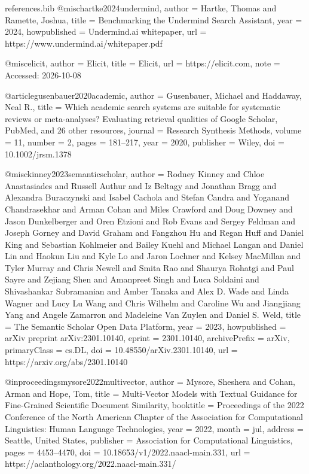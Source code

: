 \begin{filecontents*}{references.bib}
@misc{hartke2024undermind,
  author       = {Hartke, Thomas and Ramette, Joshua},
  title        = {{Benchmarking the Undermind Search Assistant}},
  year         = {2024},
  howpublished = {Undermind.ai whitepaper},
  url          = {https://www.undermind.ai/whitepaper.pdf}
}

@misc{elicit,
  author       = {{Elicit}},
  title        = {{Elicit}},
  url          = {https://elicit.com},
  note         = {Accessed: 2026-10-08}
}

@article{gusenbauer2020academic,
  author    = {Gusenbauer, Michael and Haddaway, Neal R.},
  title     = {{Which academic search systems are suitable for systematic reviews or meta-analyses? Evaluating retrieval qualities of Google Scholar, PubMed, and 26 other resources}},
  journal   = {Research Synthesis Methods},
  volume    = {11},
  number    = {2},
  pages     = {181--217},
  year      = {2020},
  publisher = {Wiley},
  doi       = {10.1002/jrsm.1378}
}

@misc{kinney2023semanticscholar,
  author        = {Rodney Kinney and Chloe Anastasiades and Russell Authur and Iz Beltagy and Jonathan Bragg and Alexandra Buraczynski and Isabel Cachola and Stefan Candra and Yoganand Chandrasekhar and Arman Cohan and Miles Crawford and Doug Downey and Jason Dunkelberger and Oren Etzioni and Rob Evans and Sergey Feldman and Joseph Gorney and David Graham and Fangzhou Hu and Regan Huff and Daniel King and Sebastian Kohlmeier and Bailey Kuehl and Michael Langan and Daniel Lin and Haokun Liu and Kyle Lo and Jaron Lochner and Kelsey MacMillan and Tyler Murray and Chris Newell and Smita Rao and Shaurya Rohatgi and Paul Sayre and Zejiang Shen and Amanpreet Singh and Luca Soldaini and Shivashankar Subramanian and Amber Tanaka and Alex D. Wade and Linda Wagner and Lucy Lu Wang and Chris Wilhelm and Caroline Wu and Jiangjiang Yang and Angele Zamarron and Madeleine Van Zuylen and Daniel S. Weld},
  title         = {{The Semantic Scholar Open Data Platform}},
  year          = {2023},
  howpublished  = {arXiv preprint arXiv:2301.10140},
  eprint        = {2301.10140},
  archivePrefix = {arXiv},
  primaryClass  = {cs.DL},
  doi           = {10.48550/arXiv.2301.10140},
  url           = {https://arxiv.org/abs/2301.10140}
}



@inproceedings{mysore2022multivector,
  author    = {Mysore, Sheshera and Cohan, Arman and Hope, Tom},
  title     = {{Multi-Vector Models with Textual Guidance for Fine-Grained Scientific Document Similarity}},
  booktitle = {Proceedings of the 2022 Conference of the North American Chapter of the Association for Computational Linguistics: Human Language Technologies},
  year      = {2022},
  month     = jul,
  address   = {Seattle, United States},
  publisher = {Association for Computational Linguistics},
  pages     = {4453--4470},
  doi       = {10.18653/v1/2022.naacl-main.331},
  url       = {https://aclanthology.org/2022.naacl-main.331/}
}


\end{filecontents*}
